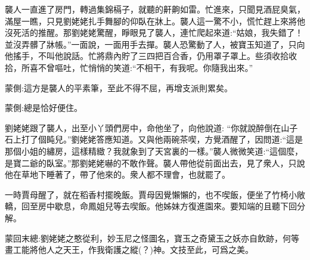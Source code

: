 \begin{parag}
    襲人一直進了房門，轉過集錦槅子，就聽的鼾齁如雷。忙進來，只聞見酒屁臭氣，滿屋一瞧，只見劉姥姥扎手舞腳的仰臥在牀上。襲人這一驚不小，慌忙趕上來將他沒死活的推醒。那劉姥姥驚醒，睜眼見了襲人，連忙爬起來道:“姑娘，我失錯了！並沒弄髒了牀帳。”一面說，一面用手去撣。襲人恐驚動了人，被寶玉知道了，只向他搖手，不叫他說話。忙將鼎內貯了三四把百合香，仍用罩子罩上。些須收拾收拾，所喜不曾嘔吐，忙悄悄的笑道:“不相干，有我呢。你隨我出來。”\begin{note}蒙側:這方是襲人的平素筆，至此不得不屈，再增支派則累矣。\end{note}\begin{note}蒙側:總是恰好便住。\end{note}劉姥姥跟了襲人，出至小丫頭們房中，命他坐了，向他說道: “你就說醉倒在山子石上打了個盹兒。”劉姥姥答應知道。又與他兩碗茶喫，方覺酒醒了，因問道:“這是那個小姐的繡房，這樣精緻？我就象到了天宮裏的一樣。”襲人微微笑道:“這個麼，是寶二爺的臥室。”那劉姥姥嚇的不敢作聲。襲人帶他從前面出去，見了衆人，只說他在草地下睡著了，帶了他來的。衆人都不理會，也就罷了。
\end{parag}


\begin{parag}
    一時賈母醒了，就在稻香村擺晚飯。賈母因覺懶懶的，也不喫飯，便坐了竹椅小敞轎，回至房中歇息，命鳳姐兒等去喫飯。他姊妹方復進園來。要知端的且聽下回分解。
\end{parag}


\begin{parag}
    \begin{note}蒙回末總:劉姥姥之憨從利，妙玉尼之怪圖名，寶玉之奇黛玉之妖亦自飲跡，何等畫工能將他人之天王，作我衛護之縱(？)神。文技至此，可爲之美。\end{note}
\end{parag}

